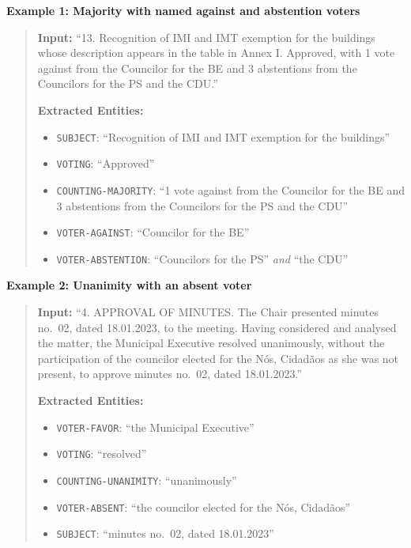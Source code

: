 \documentclass[11pt]{article}
\begin{document}
\vspace{0.5em}
\noindent\textbf{Example 1: Majority with named against and abstention voters}
\begin{quote}
\small
\textbf{Input:} ``13. Recognition of IMI and IMT exemption for the buildings whose description appears in the table in Annex I.
Approved, with 1 vote against from the Councilor for the BE and 3 abstentions from the Councilors for the PS and the CDU.''

\textbf{Extracted Entities:}
\begin{itemize}
    \vspace{-0.5em}
    \setlength\itemsep{0em}
    \item \texttt{SUBJECT}: ``Recognition of IMI and IMT exemption for the buildings''
    \item \texttt{VOTING}: ``Approved''
    \item \texttt{COUNTING-MAJORITY}: ``1 vote against from the Councilor for the BE and 3 abstentions from the Councilors for the PS and the CDU''
    \item \texttt{VOTER-AGAINST}: ``Councilor for the BE''
    \item \texttt{VOTER-ABSTENTION}: ``Councilors for the PS'' \textit{and} ``the CDU''
\end{itemize}
\end{quote}

\noindent\textbf{Example 2: Unanimity with an absent voter}
\begin{quote}
\small
\textbf{Input:} ``4. APPROVAL OF MINUTES.
The Chair presented minutes no.~02, dated 18.01.2023, to the meeting. Having considered and analysed the matter, the Municipal Executive resolved unanimously, without the participation of the councilor elected for the N\'os, Cidad\~aos as she was not present, to approve minutes no.~02, dated 18.01.2023.''

\textbf{Extracted Entities:}
\begin{itemize}
    \vspace{-0.5em}
    \setlength\itemsep{0em}
    \item \texttt{VOTER-FAVOR}: ``the Municipal Executive''
    \item \texttt{VOTING}: ``resolved''
    \item \texttt{COUNTING-UNANIMITY}: ``unanimously''
    \item \texttt{VOTER-ABSENT}: ``the councilor elected for the N\'os, Cidad\~aos''
    \item \texttt{SUBJECT}: ``minutes no.~02, dated 18.01.2023''
\end{itemize}
\end{quote}
\end{document}

